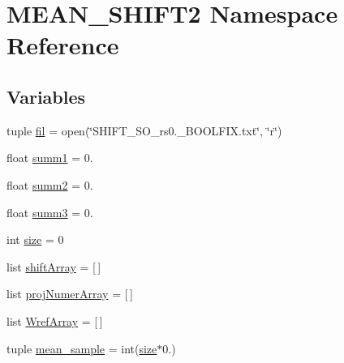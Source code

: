 \hypertarget{namespaceMEAN__SHIFT2}{\section{M\-E\-A\-N\-\_\-\-S\-H\-I\-F\-T2 Namespace Reference}
\label{namespaceMEAN__SHIFT2}
}
\subsection*{Variables}
\begin{DoxyCompactItemize}
\item 
tuple \hyperlink{namespaceMEAN__SHIFT2_a429b645482b4f4848eac1d7ccab15bb8}{fil} = open(\char`\"{}S\-H\-I\-F\-T\-\_\-S\-O\-\_\-rs0.\-\_\-\-B\-O\-O\-L\-F\-I\-X.\-txt\char`\"{}, \char`\"{}r\char`\"{})
\item 
float \hyperlink{namespaceMEAN__SHIFT2_aec3003128e620367fee0c667ef1b211c}{summ1} = 0.
\item 
float \hyperlink{namespaceMEAN__SHIFT2_a38573f9df059fdba2d3cfdfa95ce4052}{summ2} = 0.
\item 
float \hyperlink{namespaceMEAN__SHIFT2_af6b4422da32fac478ee53bd81de04947}{summ3} = 0.
\item 
int \hyperlink{namespaceMEAN__SHIFT2_a28b60e534c8af9ea786d58608d9c438e}{size} = 0
\item 
list \hyperlink{namespaceMEAN__SHIFT2_a84af3541352c1d75a94b9d21f5ceb9e2}{shift\-Array} = \mbox{[}$\,$\mbox{]}
\item 
list \hyperlink{namespaceMEAN__SHIFT2_ab52cb1545ab067638f1ed65ce37690e1}{proj\-Numer\-Array} = \mbox{[}$\,$\mbox{]}
\item 
list \hyperlink{namespaceMEAN__SHIFT2_ad9fb44ebe322dc63a83fcad0ce71c741}{Wref\-Array} = \mbox{[}$\,$\mbox{]}
\item 
tuple \hyperlink{namespaceMEAN__SHIFT2_aa93731cd8c0824625a82574955eb220f}{mean\-\_\-sample} = int(\hyperlink{namespaceMEAN__SHIFT2_a28b60e534c8af9ea786d58608d9c438e}{size}$\ast$0.)
\end{DoxyCompactItemize}


